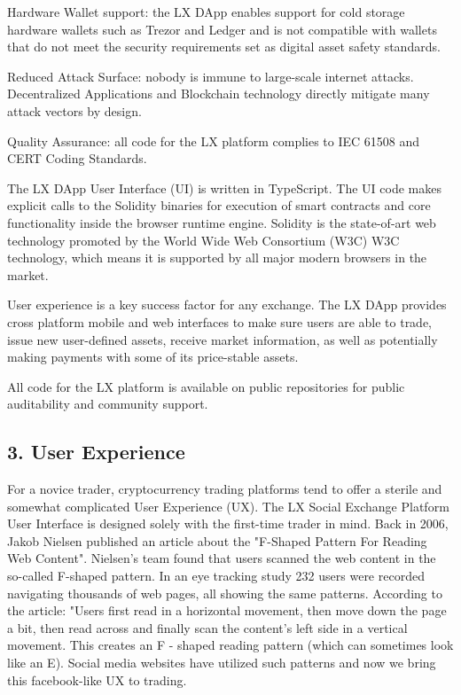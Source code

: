 \documentclass[11pt]{article}
\begin{document}
Hardware Wallet support: the LX DApp enables support for cold storage hardware wallets such as Trezor and Ledger and is not compatible with wallets that do not meet the security requirements set as digital asset safety standards.


Reduced Attack Surface: nobody is immune to large-scale internet attacks. Decentralized Applications and Blockchain technology directly mitigate many attack vectors by design.


Quality Assurance: all code for the LX platform complies to IEC 61508 and CERT Coding Standards.


The LX DApp User Interface (UI) is written in TypeScript. The UI code makes explicit calls to the Solidity binaries for execution of smart contracts and core functionality inside the browser runtime engine. Solidity is the state-of-art web technology promoted by the World Wide Web Consortium (W3C) W3C technology, which means it is supported by all major modern browsers in the market.


User experience is a key success factor for any exchange. The LX DApp provides cross platform mobile and web interfaces to make sure users are able to trade, issue new user-defined assets, receive market information, as well as potentially making payments with some of its price-stable assets.


All code for the LX platform is available on public repositories for public auditability and community support.


\subsection{3. User Experience}

For a novice trader, cryptocurrency trading platforms tend to offer a sterile and somewhat complicated User Experience (UX). The LX Social Exchange Platform User Interface is designed solely with the first-time trader in mind. Back in 2006, Jakob Nielsen published an article about the "F-Shaped Pattern For Reading Web Content". Nielsen's team found that users scanned the web content in the so-called F-shaped pattern. In an eye tracking study 232 users were recorded navigating thousands of web pages, all showing the same patterns. According to the article: "Users first read in a horizontal movement, then move down the page a bit, then read across and finally scan the content's left side in a vertical movement. This creates an F - shaped reading pattern (which can sometimes look like an E). Social media websites have utilized such patterns and now we bring this facebook-like UX to trading.
\end{document}
